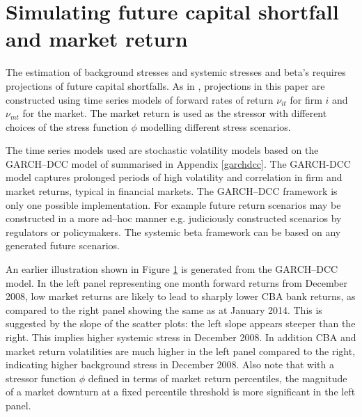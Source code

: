 \documentclass[authoryear]{elsarticle}
\newcommand{\fref}[1]{Figure \ref{#1}}
\newcommand{\aref}[1]{Appendix \ref{#1}}
\begin{document}
\section{Simulating future capital shortfall and market return}\label{simulation}



The estimation of background stresses and systemic stresses and beta's requires projections of future capital shortfalls. As in \cite{brownlees2015}, projections in this paper are constructed  using time series models of forward rates of return $\nu_{it}$ for firm $i$ and $\nu_{mt}$ for the market. The market return is used as the stressor with different choices of the stress function $\phi$ modelling different stress scenarios.

The time series models used are stochastic volatility models based on the GARCH--DCC model of \cite{engle2002dynamic} summarised in \aref{garchdcc}. The GARCH-DCC model captures prolonged periods of high volatility and correlation in firm and market returns, typical in financial markets. The GARCH--DCC framework is only one possible implementation.   For example future return scenarios may be constructed in a more ad--hoc manner e.g. judiciously constructed scenarios by regulators or policymakers.   The  systemic beta framework can be based on  any  generated  future  scenarios.

An earlier illustration shown in \fref{simulation} is generated from the GARCH--DCC model.  In the left panel representing one month forward returns from December 2008, low market returns are likely to lead to sharply lower CBA bank returns, as compared to the right panel showing the same as at January 2014.   This is suggested by the slope of the scatter plots:  the left slope appears steeper than the right. This implies higher systemic stress in December 2008. In addition CBA and market return volatilities are much higher in the left panel compared to the right, indicating higher background stress in December 2008. Also note that with a stressor function $\phi$ defined in terms of market return percentiles, the magnitude of a market downturn at a fixed percentile threshold is more significant in the left panel.

\end{document}
